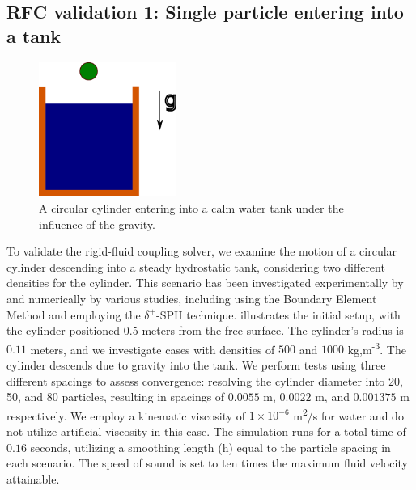 \documentclass[preprint,12pt]{elsarticle}
\begin{document}
\FloatBarrier%
\subsection{RFC validation 1: Single particle entering into a tank}
\label{sec:rfc_validation_1_single_particle_entry}
\begin{figure}[!htpb]
  \centering
  \includegraphics[width=0.4\textwidth]{images/rfc_01_skillen_2013_particle_entry_in_hs_tank/Skillen_2013_particle_entry_in_hs_tank}
  \caption{A circular cylinder entering into a calm water tank under the
    influence of the gravity.}
  \label{fig:results_rfc_01_skillen_2013}
\end{figure}

To validate the rigid-fluid coupling solver, we examine the motion of a
circular cylinder descending into a steady hydrostatic tank, considering two
different densities for the cylinder. This scenario has been investigated
experimentally by
\citet{greenhow1983nonlinear} and
numerically by various studies, including
\citet{sun2006water} using the Boundary Element Method
and \cite{sun2018accurate} employing the $\delta^+$-SPH technique.
illustrates the initial setup, with the cylinder positioned $0.5$ meters from
the free surface. The cylinder's radius is $0.11$ meters, and we investigate
cases with densities of $500$ and $1000$ kg,m\textsuperscript{-3}.
The cylinder descends due to gravity into the tank. We perform tests using
three different spacings to assess convergence: resolving the cylinder
diameter into 20, 50, and 80 particles, resulting in spacings of $0.0055$ m,
$0.0022$ m, and $0.001375$ m respectively. We employ a kinematic viscosity of
$1 \times 10^{-6}$ m\textsuperscript{2}/s for water and do not utilize artificial
viscosity in this case. The simulation runs for a total time of $0.16$
seconds, utilizing a smoothing length (h) equal to the particle spacing in
each scenario. The speed of sound is set to ten times the maximum fluid
velocity attainable.
\end{document}
